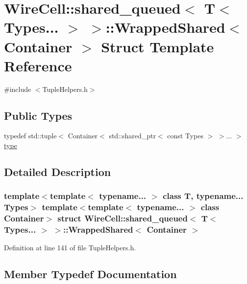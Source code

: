 \hypertarget{struct_wire_cell_1_1shared__queued_3_01_t_3_01_types_8_8_8_01_4_01_4_1_1_wrapped_shared}{}\section{Wire\+Cell\+:\+:shared\+\_\+queued$<$ T$<$ Types... $>$ $>$\+:\+:Wrapped\+Shared$<$ Container $>$ Struct Template Reference}
\label{struct_wire_cell_1_1shared__queued_3_01_t_3_01_types_8_8_8_01_4_01_4_1_1_wrapped_shared}


{\ttfamily \#include $<$Tuple\+Helpers.\+h$>$}

\subsection*{Public Types}
\begin{DoxyCompactItemize}
\item 
typedef std\+::tuple$<$ Container$<$ std\+::shared\+\_\+ptr$<$ const Types $>$ $>$... $>$ \hyperlink{struct_wire_cell_1_1shared__queued_3_01_t_3_01_types_8_8_8_01_4_01_4_1_1_wrapped_shared_a8ab769b52ad67b7d50cf1e72ad83651a}{type}
\end{DoxyCompactItemize}


\subsection{Detailed Description}
\subsubsection*{template$<$template$<$ typename... $>$ class T, typename... Types$>$\newline
template$<$template$<$ typename... $>$ class Container$>$\newline
struct Wire\+Cell\+::shared\+\_\+queued$<$ T$<$ Types... $>$ $>$\+::\+Wrapped\+Shared$<$ Container $>$}



Definition at line 141 of file Tuple\+Helpers.\+h.



\subsection{Member Typedef Documentation}
\mbox{\label{struct_wire_cell_1_1shared__queued_3_01_t_3_01_types_8_8_8_01_4_01_4_1_1_wrapped_shared_a8ab769b52ad67b7d50cf1e72ad83651a}} 

